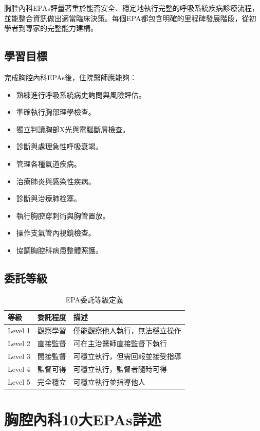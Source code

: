 \documentclass[12pt,a4paper]{article}
\newcommand{\note}[1]{
    \par
    \noindent
    \begin{tcolorbox}[
        colback=emergency_blue!5!white,
        colframe=emergency_blue,
        title=\textbf{重點提醒},
        fonttitle=\bfseries,
        boxrule=0.5pt,
        arc=3pt,
        left=6pt,
        right=6pt,
        top=6pt,
        bottom=6pt
    ]
    #1
    \end{tcolorbox}
}
\begin{document}
\vspace{0.5cm}
\note{
胸腔內科EPAs評量著重於能否安全、穩定地執行完整的呼吸系統疾病診療流程，並能整合資訊做出適當臨床決策。每個EPA都包含明確的里程碑發展階段，從初學者到專家的完整能力建構。
}

\subsection{學習目標}
完成胸腔內科EPAs後，住院醫師應能夠：
\begin{itemize}[nosep]
    \item 熟練進行呼吸系統病史詢問與風險評估。
    \item 準確執行胸部理學檢查。
    \item 獨立判讀胸部X光與電腦斷層檢查。
    \item 診斷與處理急性呼吸衰竭。
    \item 管理各種氣道疾病。
    \item 治療肺炎與感染性疾病。
    \item 診斷與治療肺栓塞。
    \item 執行胸腔穿刺術與胸管置放。
    \item 操作支氣管內視鏡檢查。
    \item 協調胸腔科病患整體照護。
\end{itemize}

\subsection{委託等級}
\begin{table}[h]
    \centering
    \caption{EPA委託等級定義}
    \begin{tabular}{p{2cm} p{3cm} p{9cm}}
        \toprule
        \textbf{等級} & \textbf{委託程度} & \textbf{描述} \\
        \midrule
        Level 1 & 觀察學習 & 僅能觀察他人執行，無法穩立操作 \\
        Level 2 & 直接監督 & 可在主治醫師直接監督下執行 \\
        Level 3 & 間接監督 & 可穩立執行，但需回報並接受指導 \\
        Level 4 & 監督可得 & 可穩立執行，監督者隨時可得 \\
        Level 5 & 完全穩立 & 可穩立執行並指導他人 \\
        \bottomrule
    \end{tabular}
\end{table}

\newpage
\section{胸腔內科10大EPAs詳述}
\end{document}
